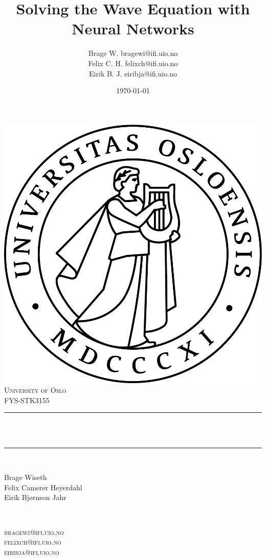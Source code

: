 \documentclass[twoside,11pt]{report}
\title{{Solving the Wave Equation with Neural Networks}}
\author{\name Brage W. \email bragewi@ifi.uio.no\\
    \name Felix C. H.  \email felixch@ifi.uio.no \\
\name Eirik B. J. \email eiribja@ifi.uio.no}
\date{\today}											%
\begin{document}

\begin{titlepage}
    \centering
    \vspace*{0.5 cm}
    \includegraphics[scale = 0.70]{uio.jpg}\\[0.2 cm]	%
    \textsc{\LARGE University of Oslo}\\[2.0 cm]	    %
    \textsc{\Large FYS-STK3155}\\[0.5 cm]				%
    \rule{\linewidth}{0.2 mm} \\[0.4 cm]
    { \huge \bfseries \@title}\\
    \rule{\linewidth}{0.2 mm} \\[1.5 cm]

    \begin{minipage}{0.4\textwidth}
        \begin{flushleft} \normalsize
            Brage Wiseth\\
            Felix Camerer Heyerdahl\\
            Eirik Bjørnson Jahr\\
        \end{flushleft}
    \end{minipage}~
    \begin{minipage}{0.4\textwidth}
        \begin{flushright} \normalsize
            \textsc{
                bragewi@ifi.uio.no\\
                felixch@ifi.uio.no\\
                eiribja@ifi.uio.no\\
            }
        \end{flushright}


\end{minipage}
\end{titlepage}
\end{document}
